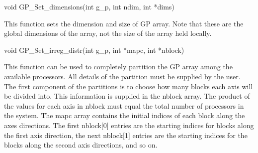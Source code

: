 \documentclass[12pt]{article}
\begin{document}


\begin{capi}
\begin{ccode}
void GP_Set_dimensions(int g_p, int ndim, int *dims)
\end{ccode}
\begin{funcargs}
\end{funcargs}
\end{capi}

\wcoll

\begin{desc}

This function sets the dimension and size of GP array. Note that these are the
global dimensions of the array, not the size of the array held locally.

\end{desc}



\begin{capi}
\begin{ccode}
void GP_Set_irreg_distr(int g_p, int *mapc, int *nblock)
\end{ccode}
\begin{funcargs}
\end{funcargs}
\end{capi}

\wcoll

\begin{desc}

This function can be used to completely partition the GP array among the
available processors. All details of the partition must be supplied by the user.
The first component of the partitions is to choose how many blocks each axis
will be divided into. This information is supplied in the nblock array. The
product of the values for each axis in nblock must equal the total number of
processors in the system. The mapc array contains the initial indices of each
block along the axes directions. The first nblock[0] entries are the starting
indices for blocks along the first axis direction, the next nblock[1] entries
are the starting indices for the blocks along the second axis directions, and so
on.

\end{desc}
\end{document}
